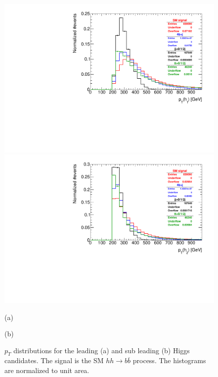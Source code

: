 \begin{figure}
	\centering
	\begin{minipage}{.5\textwidth}
		\centering
		\includegraphics[trim={.65cm 0 0 0},clip,width=\linewidth]{./Figures/hist_h1_pt.pdf}
	\end{minipage}%
	\begin{minipage}{.5\textwidth}
		\centering
		\includegraphics[trim={0 0 .65cm 0},clip,width=\linewidth]{./Figures/hist_h2_pt.pdf}
	\end{minipage}
	\begin{minipage}[t]{0.5\textwidth}
		\caption*{(a)}
	\end{minipage}%
	\hfill
	\begin{minipage}[t]{0.5\textwidth}
		\caption*{(b)}
	\end{minipage}
	\caption{$p_T$ distributions for the leading (a) and sub leading (b) Higgs candidates. The signal is the SM $hh\rightarrow b\overline{b}$ process. The histograms are normalized to unit area.}
	\label{fig:h1h2_pt}
\end{figure}

